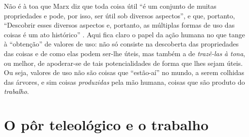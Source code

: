 Não é à toa que Marx diz que toda coisa útil ``é um conjunto de muitas propriedades e pode, por isso, ser útil sob diversos aspectos'', e que, portanto, ``Descobrir esses diversos aspectos e, portanto, as múltiplas formas de uso das coisas é um ato histórico'' \parencite[p. 113]{Marx2017}. Aqui fica claro o papel da ação humana no que tange à ``obtenção'' de valores de uso: não só consiste na descoberta das propriedades das coisas e de como elas podem ser-lhe úteis, mas também a de \textit{trazê-las à tona}, ou melhor, de apoderar-se de tais potencialidades de forma que lhes sejam úteis. Ou seja, valores de uso não são coisas que ``estão-aí'' no mundo, a serem colhidas das árvores, e sim coisas \textit{produzidas} pela mão humana, coisas que são produto do \textit{trabalho}.

\section{O pôr teleológico e o trabalho}
